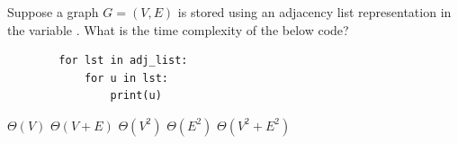 \begin{prob}
    Suppose a graph $G = (V, E)$ is stored using an adjacency list representation in
    the variable .
    What is the time complexity of the below code?

    \begin{verbatim}
        for lst in adj_list:
            for u in lst:
                print(u)
    \end{verbatim}

    \begin{choices}
        \choice $\Theta(V)$
        \choice $\Theta(V + E)$
        \choice $\Theta(V^2)$
        \choice $\Theta(E^2)$
        \choice $\Theta(V^2 + E^2)$
    \end{choices}

\end{prob}

